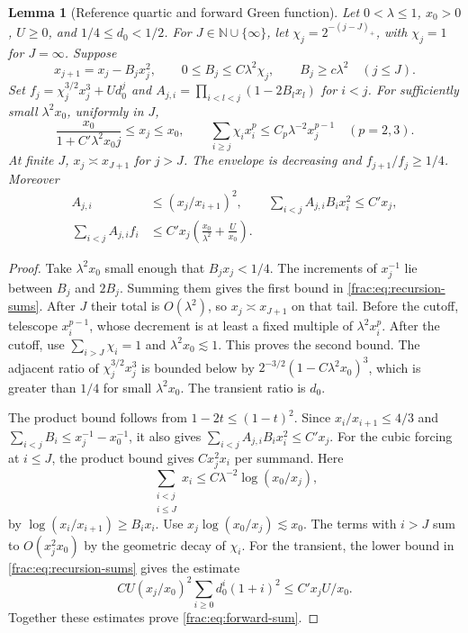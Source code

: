 \documentclass[11pt]{article}
\newtheorem{lemma}[proposition]{Lemma}
\begin{document}
\begin{lemma}[Reference quartic and forward Green function]
\label{lem:reference-quartic}
Let \(0<\lambda\le1\), \(x_0>0\), \(U\ge0\), and
\(1/4\le d_0<1/2\). For \(J\in\mathbb N\cup\{\infty\}\), let
\(\chi_j=2^{-(j-J)_+}\), with \(\chi_j=1\) for \(J=\infty\).
Suppose
\[
 x_{j+1}=x_j-B_jx_j^2,\qquad
 0\le B_j\le C\lambda^2\chi_j,\qquad B_j\ge c\lambda^2\quad(j\le J).
\]
Set \(f_j=\chi_j^{3/2}x_j^3+Ud_0^j\) and
\(A_{j,i}=\prod_{i<l<j}(1-2B_lx_l)\) for \(i<j\).
For sufficiently small \(\lambda^2x_0\), uniformly in \(J\),
\begin{equation}\label{frac:eq:recursion-sums}
 \frac{x_0}{1+C'\lambda^2x_0j}\le x_j\le x_0,\qquad
 \sum_{i\ge j}\chi_i x_i^p\le C_p\lambda^{-2}x_j^{p-1}
 \quad(p=2,3).
\end{equation}
At finite \(J\), \(x_j\asymp x_{J+1}\) for \(j>J\).
The envelope is decreasing and \(f_{j+1}/f_j\ge1/4\).
Moreover
\begin{align}
 A_{j,i}&\le(x_j/x_{i+1})^2,\qquad
 \sum_{i<j} A_{j,i}B_ix_i^2\le C'x_j,\nonumber\\
 \sum_{i<j} A_{j,i}f_i
    &\le C'x_j\left(\frac{x_0}{\lambda^2}+\frac U{x_0}\right).
 \label{frac:eq:forward-sum}
\end{align}
\end{lemma}

\begin{proof}
Take \(\lambda^2x_0\) small enough that \(B_jx_j<1/4\).
The increments of \(x_j^{-1}\) lie between \(B_j\) and \(2B_j\).
Summing them gives the first bound in \eqref{frac:eq:recursion-sums}.
After \(J\) their total is \(O(\lambda^2)\), so \(x_j\asymp x_{J+1}\)
on that tail. Before the cutoff, telescope \(x_i^{p-1}\), whose
decrement is at least a fixed multiple of \(\lambda^2x_i^p\).
After the cutoff, use \(\sum_{i>J}\chi_i=1\) and
\(\lambda^2x_0\lesssim1\). This proves the second bound.
The adjacent ratio of \(\chi_j^{3/2}x_j^3\) is bounded below by
\(2^{-3/2}(1-C\lambda^2x_0)^3\), which is greater than \(1/4\)
for small \(\lambda^2x_0\). The transient ratio is \(d_0\).

The product bound follows from \(1-2t\le(1-t)^2\). Since
\(x_i/x_{i+1}\le4/3\) and \(\sum_{i<j} B_i\le x_j^{-1}-x_0^{-1}\),
it also gives \(\sum_{i<j} A_{j,i} B_i x_i^2\le C'x_j\).
For the cubic forcing at \(i\le J\), the product bound gives
\(C x_j^2 x_i\) per summand. Here
\[
 \sum_{\substack{i<j\\i\le J}}x_i
 \le C\lambda^{-2}\log(x_0/x_j),
\]
by \(\log(x_i/x_{i+1})\ge B_i x_i\). Use
\(x_j\log(x_0/x_j)\lesssim x_0\).
The terms with \(i>J\) sum to \(O(x_j^2 x_0)\) by the geometric
decay of \(\chi_i\). For the transient, the lower bound in
\eqref{frac:eq:recursion-sums} gives the estimate
\[
 C U(x_j/x_0)^2\sum_{i\ge0}d_0^i(1+i)^2
 \le C' x_j U/x_0 .
\]
Together these estimates prove \eqref{frac:eq:forward-sum}.
\end{proof}
\end{document}
